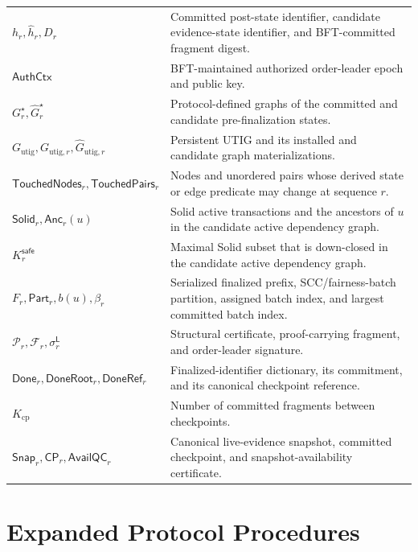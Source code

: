 \begin{table}[t]
\begin{tabular}{p{}p{}}
$h_r,\widehat h_r,D_r$ & Committed post-state identifier, candidate evidence-state identifier, and BFT-committed fragment digest. \\
$\mathsf{AuthCtx}$ & BFT-maintained authorized order-leader epoch and public key. \\
$G_r^\star,\widehat G_r^\star$ & Protocol-defined graphs of the committed and candidate pre-finalization states. \\
$G_{\mathrm{utig}},G_{\mathrm{utig},r},\widehat G_{\mathrm{utig},r}$ & Persistent UTIG and its installed and candidate graph materializations. \\
$\mathsf{TouchedNodes}_r,\mathsf{TouchedPairs}_r$ & Nodes and unordered pairs whose derived state or edge predicate may change at sequence $r$. \\
$\mathsf{Solid}_r,\mathsf{Anc}_r(u)$ & Solid active transactions and the ancestors of $u$ in the candidate active dependency graph. \\
$K_r^{\mathsf{safe}}$ & Maximal Solid subset that is down-closed in the candidate active dependency graph. \\
$F_r,\mathsf{Part}_r,b(u),\beta_r$ & Serialized finalized prefix, SCC/fairness-batch partition, assigned batch index, and largest committed batch index. \\
$\mathcal P_r,\mathcal F_r,\sigma_r^{\mathsf L}$ & Structural certificate, proof-carrying fragment, and order-leader signature. \\
$\mathsf{Done}_r,\mathsf{DoneRoot}_r,\mathsf{DoneRef}_r$ & Finalized-identifier dictionary, its commitment, and its canonical checkpoint reference. \\
$K_{\mathrm{cp}}$ & Number of committed fragments between checkpoints. \\
$\mathsf{Snap}_r,\mathsf{CP}_r,\mathsf{AvailQC}_r$ & Canonical live-evidence snapshot, committed checkpoint, and snapshot-availability certificate. \\
\hline
\end{tabular}
\end{table}

\section{Expanded Protocol Procedures}
\label{app:expanded-protocol}

